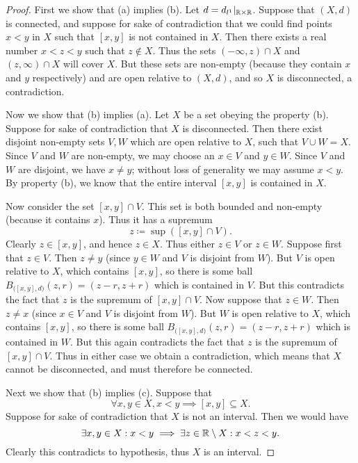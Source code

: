 \begin{proof}
  First we show that (a) implies (b).
  Let \(d = d_{l^1}|_{\mathbb{R} \times \mathbb{R}}\).
  Suppose that \((X, d)\) is connected, and suppose for sake of contradiction that we could find points \(x < y\) in \(X\) such that \([x, y]\) is not contained in \(X\).
  Then there exists a real number \(x < z < y\) such that \(z \notin X\).
  Thus the sets \((-\infty, z) \cap X\) and \((z, \infty) \cap X\) will cover \(X\).
  But these sets are non-empty (because they contain \(x\) and \(y\) respectively) and are open relative to \((X, d)\), and so \(X\) is disconnected, a contradiction.

  Now we show that (b) implies (a).
  Let \(X\) be a set obeying the property (b).
  Suppose for sake of contradiction that \(X\) is disconnected.
  Then there exist disjoint non-empty sets \(V , W\) which are open relative to \(X\), such that \(V \cup W = X\).
  Since \(V\) and \(W\) are non-empty, we may choose an \(x \in V\) and \(y \in W\).
  Since \(V\) and \(W\) are disjoint, we have \(x \neq y\);
  without loss of generality we may assume \(x < y\).
  By property (b), we know that the entire interval \([x, y]\) is contained in \(X\).

  Now consider the set \([x, y] \cap V\).
  This set is both bounded and non-empty (because it contains \(x\)).
  Thus it has a supremum
  \[
    z \coloneqq \sup([x, y] \cap V).
  \]
  Clearly \(z \in [x, y]\), and hence \(z \in X\).
  Thus either \(z \in V\) or \(z \in W\).
  Suppose first that \(z \in V\).
  Then \(z \neq y\) (since \(y \in W\) and \(V\) is disjoint from \(W\)).
  But \(V\) is open relative to \(X\), which contains \([x, y]\), so there is some ball \(B_{\big([x,y], d\big)}(z, r) = (z - r, z + r)\) which is contained in \(V\).
  But this contradicts the fact that \(z\) is the supremum of \([x, y] \cap V\).
  Now suppose that \(z \in W\).
  Then \(z \neq x\) (since \(x \in V\) and \(V\) is disjoint from \(W\)).
  But \(W\) is open relative to \(X\), which contains \([x, y]\), so there is some ball \(B_{\big([x,y], d\big)}(z, r) = (z - r, z + r)\) which is contained in \(W\).
  But this again contradicts the fact that \(z\) is the supremum of \([x, y] \cap V\).
  Thus in either case we obtain a contradiction, which means that \(X\) cannot be disconnected, and must therefore be connected.

  Next we show that (b) implies (c).
  Suppose that
  \[
    \forall x, y \in X, x < y \implies [x, y] \subseteq X.
  \]
  Suppose for sake of contradiction that \(X\) is not an interval.
  Then we would have
  \[
    \exists x, y \in X : x < y \implies \exists z \in \mathbb{R} \setminus X : x < z < y.
  \]
  Clearly this contradicts to hypothesis, thus \(X\) is an interval.


\end{proof}
